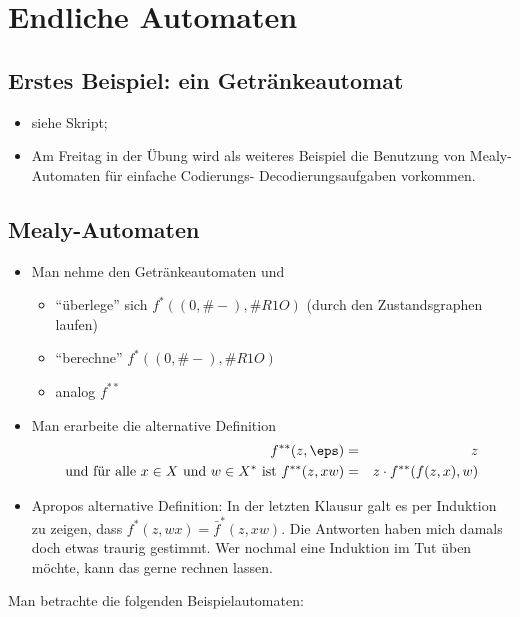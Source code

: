 \documentclass[12pt]{article}
\theoremstyle{margin}
\theoremstyle{margin}
\begin{document}
\setcounter{section}{9}

\section{Endliche Automaten}
\subsection{Erstes Beispiel: ein Getr\"ankeautomat}
  \begin{itemize}
  \item siehe Skript;
  \item Am Freitag in der Übung wird als weiteres Beispiel die Benutzung von
    Mealy-Automaten für einfache Codierungs- \bzw Decodierungsaufgaben
    vorkommen.
  \end{itemize}
\subsection{Mealy-Automaten}
  \begin{itemize}
  \item Man nehme den Getränkeautomaten und
    \begin{itemize}
    \item "`überlege"' sich $f^*((0,\#-), \#{R1O})$ (durch den
      Zustandsgraphen laufen)
    \item "`berechne"' $f^*((0,\#-), \#{R1O})$
    \item analog $f^{**}$
    \end{itemize}
  \item Man erarbeite die alternative Definition
    \begin{eqnarray*}
      f^{**}(z, \eps) &=& z \\
      \text{und für alle $x\in X$ und $w\in X^*$ ist\ }
      f^{**}(z, xw)   &=& z \cdot f^{**}(f(z,x),w) \\
    \end{eqnarray*}
  \item Apropos alternative Definition: In der letzten Klausur galt es per Induktion zu zeigen, dass $f^*(z,wx) = \bar{f}^*(z,xw)$.
      Die Antworten haben mich damals doch etwas traurig gestimmt. Wer nochmal eine Induktion im Tut üben möchte, kann das gerne rechnen lassen.
  \end{itemize}
  Man betrachte die folgenden Beispielautomaten:
\end{document}
